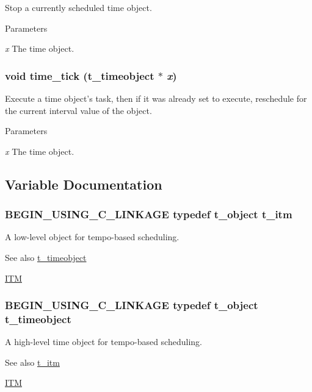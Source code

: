 Stop a currently scheduled time object. 
\begin{DoxyParams}{Parameters}
\item[{\em x}]The time object. \end{DoxyParams}
\hypertarget{group__time_ga31b3eecc1bd31944239fab1b6c309b5b}{
\subsubsection[{time\_\-tick}]{\setlength{\rightskip}{0pt plus 5cm}void time\_\-tick ({\bf t\_\-timeobject} $\ast$ {\em x})}}
\label{group__time_ga31b3eecc1bd31944239fab1b6c309b5b}


Execute a time object's task, then if it was already set to execute, reschedule for the current interval value of the object. 
\begin{DoxyParams}{Parameters}
\item[{\em x}]The time object. \end{DoxyParams}


\subsection{Variable Documentation}
\hypertarget{group__time_gac656fa1f920c69cf77e6631bcec53077}{
\subsubsection[{t\_\-itm}]{\setlength{\rightskip}{0pt plus 5cm}BEGIN\_\-USING\_\-C\_\-LINKAGE typedef {\bf t\_\-object} {\bf t\_\-itm}}}
\label{group__time_gac656fa1f920c69cf77e6631bcec53077}


A low-\/level object for tempo-\/based scheduling. \begin{DoxySeeAlso}{See also}
\hyperlink{group__time_gab568d2ffd4d84ca17c0b90cf2f7c6a40}{t\_\-timeobject} 

\hyperlink{chapter_itm}{ITM} 
\end{DoxySeeAlso}
\hypertarget{group__time_gab568d2ffd4d84ca17c0b90cf2f7c6a40}{
\subsubsection[{t\_\-timeobject}]{\setlength{\rightskip}{0pt plus 5cm}BEGIN\_\-USING\_\-C\_\-LINKAGE typedef {\bf t\_\-object} {\bf t\_\-timeobject}}}
\label{group__time_gab568d2ffd4d84ca17c0b90cf2f7c6a40}


A high-\/level time object for tempo-\/based scheduling. \begin{DoxySeeAlso}{See also}
\hyperlink{group__time_gac656fa1f920c69cf77e6631bcec53077}{t\_\-itm} 

\hyperlink{chapter_itm}{ITM} 
\end{DoxySeeAlso}
